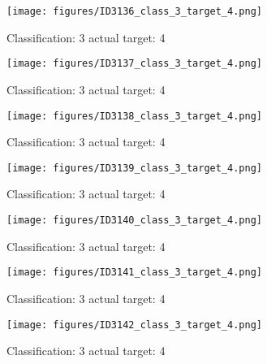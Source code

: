 \begin{figure}[h!]
\begin{center}
\texttt{[image: figures/ID3136\_class\_3\_target\_4.png]}
\end{center}
\caption{ Classification: 3 actual target: 4}
\label{fig:ID3136_class_3_target_4}
\end{figure}
\begin{figure}[h!]
\begin{center}
\texttt{[image: figures/ID3137\_class\_3\_target\_4.png]}
\end{center}
\caption{ Classification: 3 actual target: 4}
\label{fig:ID3137_class_3_target_4}
\end{figure}
\begin{figure}[h!]
\begin{center}
\texttt{[image: figures/ID3138\_class\_3\_target\_4.png]}
\end{center}
\caption{ Classification: 3 actual target: 4}
\label{fig:ID3138_class_3_target_4}
\end{figure}
\begin{figure}[h!]
\begin{center}
\texttt{[image: figures/ID3139\_class\_3\_target\_4.png]}
\end{center}
\caption{ Classification: 3 actual target: 4}
\label{fig:ID3139_class_3_target_4}
\end{figure}
\begin{figure}[h!]
\begin{center}
\texttt{[image: figures/ID3140\_class\_3\_target\_4.png]}
\end{center}
\caption{ Classification: 3 actual target: 4}
\label{fig:ID3140_class_3_target_4}
\end{figure}
\begin{figure}[h!]
\begin{center}
\texttt{[image: figures/ID3141\_class\_3\_target\_4.png]}
\end{center}
\caption{ Classification: 3 actual target: 4}
\label{fig:ID3141_class_3_target_4}
\end{figure}
\begin{figure}[h!]
\begin{center}
\texttt{[image: figures/ID3142\_class\_3\_target\_4.png]}
\end{center}
\caption{ Classification: 3 actual target: 4}
\label{fig:ID3142_class_3_target_4}
\end{figure}
